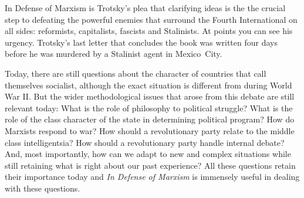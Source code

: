 In Defense of Marxism is Trotsky’s plea that clarifying ideas is the the crucial step to defeating the powerful enemies that surround the Fourth International on all sides: reformists, capitalists, fascists and Stalinists. At points you can see his urgency. Trotsky’s last letter that concludes the book was written four days before he was murdered by a Stalinist agent in Mexico~City.

Today, there are still questions about the character of countries that call themselves socialist, although the exact situation is different from during World War II. But the wider methodological issues that arose from this debate are still relevant today: What is the role of philosophy to political struggle? What is the role of the class character of the state in determining political program? How do Marxists respond to war? How should a revolutionary party relate to the middle class intelligentsia? How should a revolutionary party handle internal debate? And, most importantly, how can we adapt to new and complex situations while still retaining what is right about our past experience? All these questions retain their importance today and \emph{In Defense of Marxism} is immensely useful in dealing with these questions.

